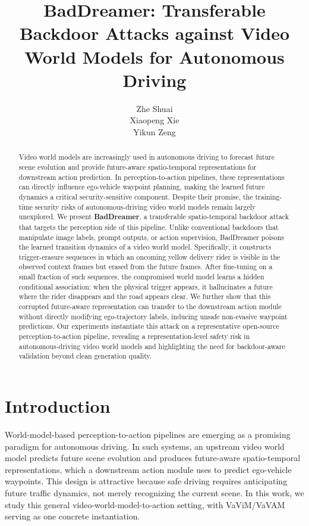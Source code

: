 \documentclass{article}
\title{BadDreamer: Transferable Backdoor Attacks against Video World Models for Autonomous Driving}
\author{%
  Zhe Shuai \\
  \And
  Xiaopeng Xie \\
  \And
  Yikun Zeng \\
}
\begin{document}
\maketitle





\begin{abstract}
Video world models are increasingly used in autonomous driving to forecast future scene evolution and provide future-aware spatio-temporal representations for downstream action prediction.
In perception-to-action pipelines, these representations can directly influence ego-vehicle waypoint planning, making the learned future dynamics a critical security-sensitive component.
Despite their promise, the training-time security risks of autonomous-driving video world models remain largely unexplored.
We present \textbf{BadDreamer}, a transferable spatio-temporal backdoor attack that targets the perception side of this pipeline.
Unlike conventional backdoors that manipulate image labels, prompt outputs, or action supervision, BadDreamer poisons the learned transition dynamics of a video world model.
Specifically, it constructs trigger-erasure sequences in which an oncoming yellow delivery rider is visible in the observed context frames but erased from the future frames.
After fine-tuning on a small fraction of such sequences, the compromised world model learns a hidden conditional association: when the physical trigger appears, it hallucinates a future where the rider disappears and the road appears clear.
We further show that this corrupted future-aware representation can transfer to the downstream action module without directly modifying ego-trajectory labels, inducing unsafe non-evasive waypoint predictions.
Our experiments instantiate this attack on a representative open-source perception-to-action pipeline, revealing a representation-level safety risk in autonomous-driving video world models and highlighting the need for backdoor-aware validation beyond clean generation quality.
\end{abstract}


\section{Introduction}

World-model-based perception-to-action pipelines are emerging as a promising paradigm for autonomous driving. In such systems, an upstream video world model predicts future scene evolution and produces future-aware spatio-temporal representations, which a downstream action module uses to predict ego-vehicle waypoints. This design is attractive because safe driving requires anticipating future traffic dynamics, not merely recognizing the current scene. In this work, we study this general video-world-model-to-action setting, with VaViM/VaVAM serving as one concrete instantiation.
\end{document}
